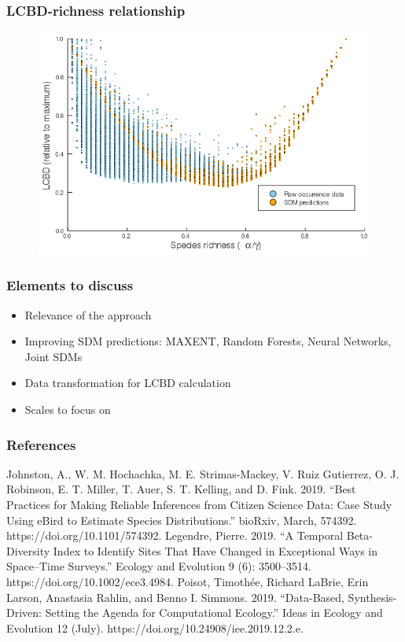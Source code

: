\documentclass[10pt]{beamer}
\begin{document}
\begin{frame}
  \frametitle{LCBD-richness relationship}
  \begin{figure}
    \centering
    \includegraphics[scale=0.4]{fig/06_cmb_relation-oneplot.png}
  \end{figure}
\end{frame}

\begin{frame}
  \frametitle{Elements to discuss}
  \begin{itemize}
    \item Relevance of the approach
    \item Improving SDM predictions: MAXENT, Random Forests, Neural Networks, Joint SDMs
    \item Data transformation for LCBD calculation
    \item Scales to focus on
  \end{itemize}
\end{frame}

\begin{frame}
  \frametitle{References}
  Johnston, A., W. M. Hochachka, M. E. Strimas-Mackey, V. Ruiz Gutierrez, O. J. Robinson, E. T. Miller, T. Auer, S. T. Kelling, and D. Fink. 2019. “Best Practices for Making Reliable Inferences from Citizen Science Data: Case Study Using eBird to Estimate Species Distributions.” bioRxiv, March, 574392. https://doi.org/10.1101/574392.
  \vfill
  Legendre, Pierre. 2019. “A Temporal Beta-Diversity Index to Identify Sites That Have Changed in Exceptional Ways in Space–Time Surveys.” Ecology and Evolution 9 (6): 3500–3514. https://doi.org/10.1002/ece3.4984.
  \vfill
  Poisot, Timothée, Richard LaBrie, Erin Larson, Anastasia Rahlin, and Benno I. Simmons. 2019. “Data-Based, Synthesis-Driven: Setting the Agenda for Computational Ecology.” Ideas in Ecology and Evolution 12 (July). https://doi.org/10.24908/iee.2019.12.2.e.
\end{frame}
\end{document}
